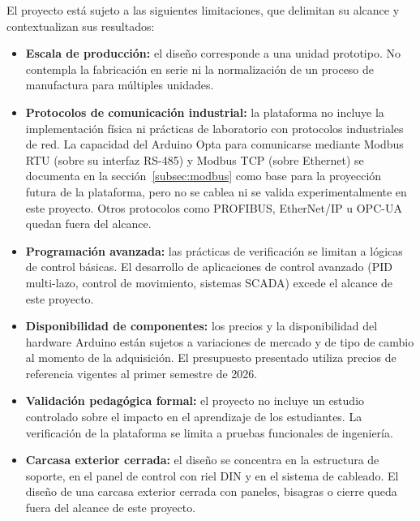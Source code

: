 \documentclass[12pt,a4paper,oneside]{report}
\begin{document}
El proyecto está sujeto a las siguientes limitaciones, que delimitan su alcance y contextualizan
sus resultados:

\begin{itemize}
    \item \textbf{Escala de producción:} el diseño corresponde a una unidad prototipo. No
    contempla la fabricación en serie ni la normalización de un proceso de manufactura para
    múltiples unidades.

    \item \textbf{Protocolos de comunicación industrial:} la plataforma no incluye la
    implementación física ni prácticas de laboratorio con protocolos industriales de red. La
    capacidad del Arduino Opta para comunicarse mediante Modbus RTU (sobre su interfaz RS-485) y
    Modbus TCP (sobre Ethernet) se documenta en la sección~\ref{subsec:modbus} como base para la
    proyección futura de la plataforma, pero no se cablea ni se valida experimentalmente en este
    proyecto. Otros protocolos como PROFIBUS, EtherNet/IP u OPC-UA quedan fuera del alcance.

    \item \textbf{Programación avanzada:} las prácticas de verificación se limitan a lógicas de
    control básicas. El desarrollo de aplicaciones de control avanzado (PID multi-lazo, control de
    movimiento, sistemas SCADA) excede el alcance de este proyecto.

    \item \textbf{Disponibilidad de componentes:} los precios y la disponibilidad del hardware
    Arduino están sujetos a variaciones de mercado y de tipo de cambio al momento de la
    adquisición. El presupuesto presentado utiliza precios de referencia vigentes al primer
    semestre de 2026.

    \item \textbf{Validación pedagógica formal:} el proyecto no incluye un estudio controlado sobre
    el impacto en el aprendizaje de los estudiantes. La verificación de la plataforma se limita a
    pruebas funcionales de ingeniería.

    \item \textbf{Carcasa exterior cerrada:} el diseño se concentra en la estructura de soporte,
    en el panel de control con riel DIN y en el sistema de cableado. El diseño de una carcasa
    exterior cerrada con paneles, bisagras o cierre queda fuera del alcance de este proyecto.
\end{itemize}
\end{document}
